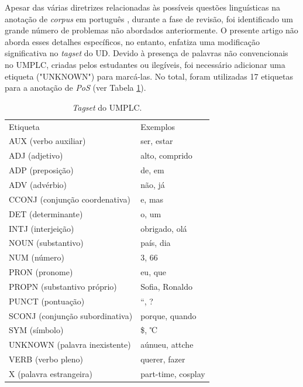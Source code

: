 \documentclass[portuguese]{textolivre}
\begin{document}
Apesar das várias diretrizes relacionadas às possíveis questões linguísticas na anotação de \textit{corpus} em português \cite{de2016universal,rademaker2017universal}, durante a fase de revisão, foi identificado um grande número de problemas não abordados anteriormente. O presente artigo não aborda esses detalhes específicos, no entanto, enfatiza uma modificação significativa no \textit{tagset} do UD. Devido à presença de palavras não convencionais no UMPLC, criadas pelos estudantes ou ilegíveis, foi necessário adicionar uma etiqueta ("UNKNOWN") para marcá-las. No total, foram utilizadas 17 etiquetas para a anotação de \textit{PoS} (ver Tabela \ref{Tab3}). 

\begin{table}[h]
\centering
\begin{threeparttable}
\caption{\textit{Tagset} do UMPLC.}
\label{Tab3}
\begin{tabular}{ll}
\toprule
Etiqueta                        & Exemplos           \\ 
AUX (verbo auxiliar)            & ser, estar         \\ 
ADJ (adjetivo)                  & alto, comprido     \\ 
ADP (preposição)                & de, em             \\ 
ADV (advérbio)                  & não, já            \\ 
CCONJ (conjunção coordenativa)  & e, mas             \\ 
DET (determinante)              & o, um              \\ 
INTJ (interjeição)              & obrigado, olá      \\ 
NOUN (substantivo)              & país, dia          \\ 
NUM (número)                    & 3, 66              \\ 
PRON (pronome)                  & eu, que            \\ 
PROPN (substantivo próprio)     & Sofia, Ronaldo     \\ 
PUNCT (pontuação)               & “, ?               \\ 
SCONJ (conjunção subordinativa) & porque, quando     \\ 
SYM (símbolo)                   & \$, ℃              \\ 
UNKNOWN (palavra inexistente)   & aúnueu, attche     \\ 
VERB (verbo pleno)              & querer, fazer      \\ 
X (palavra estrangeira)         & part-time, cosplay \\ 
\bottomrule
\end{tabular}
\end{threeparttable}
\end{table}
\end{document}
